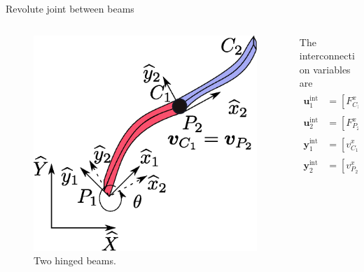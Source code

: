 \documentclass[aspectratio=169]{ISAE-Beamer}
\begin{document}
\begin{frame}{Revolute joint between beams}
\begin{columns}
\begin{column}{0.5\textwidth}
	\begin{tcolorbox}
		\begin{figure}[t]
			\centering
			\includegraphics[width=0.9\columnwidth]{part_4/pHfmd/beam_int.eps} 
			\caption{Two hinged beams.}
			\label{fig:beam_int}
		\end{figure}
	\end{tcolorbox}
\end{column}
\begin{column}{0.5\textwidth}
	The interconnection variables are
	\begin{equation*}
	\begin{aligned}
	\mathbf{u}_1^{\text{int}} &= [F^x_{C_1}, \, F^y_{C_1}]^\top := \mathbf{F}_{C_1}, \\
	\mathbf{u}_2^{\text{int}} &= [F^x_{P_2}, \, F^y_{P_2}]^\top := \mathbf{F}_{P_2}, \\
	\mathbf{y}_1^{\text{int}} &= [v^x_{C_1}, \, v^y_{C_1}]^\top := \mathbf{v}_{C_1}, \\
	\mathbf{y}_2^{\text{int}} &= [v^x_{P_2}, \, v^y_{P_2}]^\top := \mathbf{v}_{P_2}.
	\end{aligned}
	\end{equation*}
	
\end{column}
\end{columns}

\end{frame}
\end{document}
